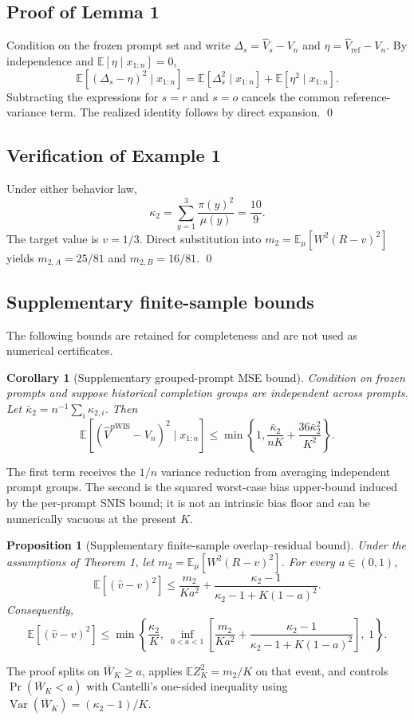 \documentclass[10pt]{article}
\newtheorem{proposition}{Proposition}
\newtheorem{corollary}{Corollary}
\theoremstyle{remark}
\newcommand{\E}{\mathbb{E}}
\newcommand{\Var}{\operatorname{Var}}
\newcommand{\pWIS}{\mathrm{pWIS}}
\begin{document}
\subsection{Proof of Lemma 1}
Condition on the frozen prompt set and write $\Delta_s=\widehat V_s-V_n$ and $\eta=\widehat V_{\mathrm{ref}}-V_n$. By independence and $\E[\eta\mid x_{1:n}]=0$,
\[
\E[(\Delta_s-\eta)^2\mid x_{1:n}]=\E[\Delta_s^2\mid x_{1:n}]+\E[\eta^2\mid x_{1:n}].
\]
Subtracting the expressions for $s=r$ and $s=o$ cancels the common reference-variance term. The realized identity follows by direct expansion. \qed

\subsection{Verification of Example 1}
Under either behavior law,
\[
\kappa_2=\sum_{y=1}^{3}\frac{\pi(y)^2}{\mu(y)}=\frac{10}{9}.
\]
The target value is $v=1/3$. Direct substitution into $m_2=\E_\mu[W^2(R-v)^2]$ yields $m_{2,A}=25/81$ and $m_{2,B}=16/81$. \qed

\subsection{Supplementary finite-sample bounds}
The following bounds are retained for completeness and are not used as numerical certificates.

\begin{corollary}[Supplementary grouped-prompt MSE bound]
Condition on frozen prompts and suppose historical completion groups are independent across prompts. Let $\bar\kappa_2=n^{-1}\sum_i\kappa_{2,i}$. Then
\begin{equation}
\E[(\widehat V^{\pWIS}-V_n)^2\mid x_{1:n}]
\le \min\!\left\{1,\frac{\bar\kappa_2}{nK}+\frac{36\bar\kappa_2^2}{K^2}\right\}.
\end{equation}
\end{corollary}
The first term receives the $1/n$ variance reduction from averaging independent prompt groups. The second is the squared worst-case bias upper-bound induced by the per-prompt SNIS bound; it is not an intrinsic bias floor and can be numerically vacuous at the present $K$.

\begin{proposition}[Supplementary finite-sample overlap--residual bound]
Under the assumptions of Theorem 1, let $m_2=\E_\mu[W^2(R-v)^2]$. For every $a\in(0,1)$,
\begin{equation}
\E[(\widehat v-v)^2]\le \frac{m_2}{Ka^2}+\frac{\kappa_2-1}{\kappa_2-1+K(1-a)^2}.
\end{equation}
Consequently,
\begin{equation}
\E[(\widehat v-v)^2]\le
\min\!\left\{\frac{\kappa_2}{K},\ \inf_{0<a<1}\left[\frac{m_2}{Ka^2}+\frac{\kappa_2-1}{\kappa_2-1+K(1-a)^2}\right],\ 1\right\}.
\end{equation}
\end{proposition}
The proof splits on $\overline W_K\ge a$, applies $\E Z_K^2=m_2/K$ on that event, and controls $\Pr(\overline W_K<a)$ with Cantelli's one-sided inequality using $\Var(\overline W_K)=(\kappa_2-1)/K$.
\end{document}

